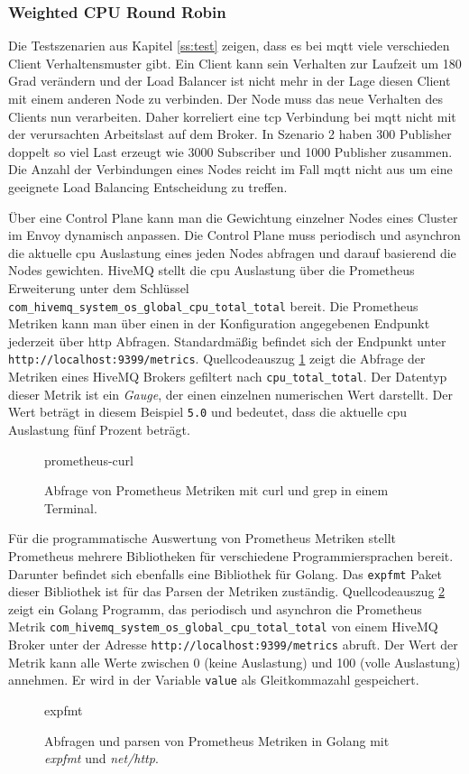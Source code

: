 \subsubsection{Weighted CPU Round Robin} \label{ss:weighted-cpu}
Die Testszenarien aus Kapitel \ref{ss:test} zeigen, dass es bei \ac{mqtt} viele verschieden Client Verhaltensmuster gibt. Ein Client kann sein Verhalten zur Laufzeit um 180 Grad verändern und der Load Balancer ist nicht mehr in der Lage diesen Client mit einem anderen Node zu verbinden. Der Node muss das neue Verhalten des Clients nun verarbeiten.
Daher korreliert eine \ac{tcp} Verbindung bei \ac{mqtt} nicht mit der verursachten Arbeitslast auf dem Broker. In Szenario 2 haben 300 Publisher doppelt so viel Last erzeugt wie 3000 Subscriber und 1000 Publisher zusammen.
Die Anzahl der Verbindungen eines Nodes reicht im Fall \ac{mqtt} nicht aus um eine geeignete Load Balancing Entscheidung zu treffen.

Über eine Control Plane kann man die Gewichtung einzelner Nodes eines Cluster im Envoy dynamisch anpassen.
Die Control Plane muss periodisch und asynchron die aktuelle \ac{cpu} Auslastung eines jeden Nodes abfragen und darauf basierend die Nodes gewichten.
HiveMQ stellt die \ac{cpu} Auslastung über die Prometheus Erweiterung unter dem Schlüssel \verb|com_hivemq_system_os_global_cpu_total_total| bereit.
Die Prometheus Metriken kann man über einen in der Konfiguration angegebenen Endpunkt jederzeit über \ac{http} Abfragen. Standardmä{\ss}ig befindet sich der Endpunkt unter \verb|http://localhost:9399/metrics|.
Quellcodeauszug \ref{code:prometheus-curl} zeigt die Abfrage der Metriken eines HiveMQ Brokers gefiltert nach \verb|cpu_total_total|. Der Datentyp dieser Metrik ist ein \textit{Gauge}, der einen einzelnen numerischen Wert darstellt.\cite{prometheusMetricTypesPrometheus} Der Wert beträgt in diesem Beispiel \verb|5.0| und bedeutet, dass die aktuelle \ac{cpu} Auslastung fünf Prozent beträgt.
\begin{figure}
    {prometheus-curl}
    \caption{Abfrage von Prometheus Metriken mit curl und grep in einem Terminal.}
    \label{code:prometheus-curl}
\end{figure}
Für die programmatische Auswertung von Prometheus Metriken stellt Prometheus mehrere Bibliotheken für verschiedene Programmiersprachen bereit. Darunter befindet sich ebenfalls eine Bibliothek für Golang. Das \verb|expfmt| Paket dieser Bibliothek ist für das Parsen der Metriken zuständig.\cite{ExpfmtPkgGo}
Quellcodeauszug \ref{code:expfmt} zeigt ein Golang Programm, das periodisch und asynchron die Prometheus Metrik \verb|com_hivemq_system_os_global_cpu_total_total| von einem HiveMQ Broker unter der Adresse \verb|http://localhost:9399/metrics| abruft. Der Wert der Metrik kann alle Werte zwischen 0 (keine Auslastung) und 100 (volle Auslastung) annehmen. Er wird in der Variable \verb|value| als Gleitkommazahl gespeichert.
\begin{figure}
    {expfmt}
    \caption{Abfragen und parsen von Prometheus Metriken in Golang mit \textit{expfmt} und \textit{net/http}.}
    \label{code:expfmt}
\end{figure}
\\

